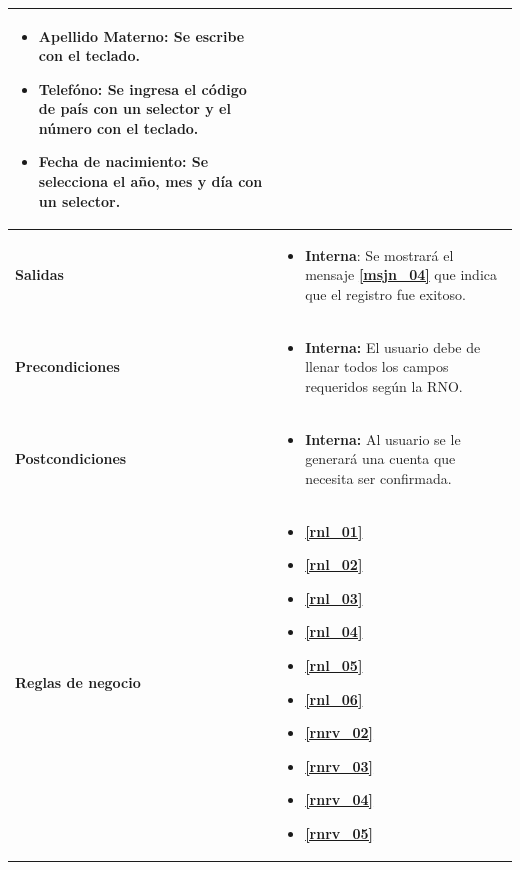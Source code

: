 \begin{center}
\begin{longtable}{| p{3.5cm} | p{11.5cm} |}
\begin{itemize}
              \item \textbf{Apellido Materno}: Se escribe con el teclado.
              \item \textbf{Telefóno}: Se ingresa el código de país con un selector y el número con el teclado.
              \item \textbf{Fecha de nacimiento}: Se selecciona el año, mes y día con un selector.
            \end{itemize} \\
        \hline	
          \textbf{Salidas} &  
          \begin{itemize}
              \item \textbf{Interna}: Se mostrará el mensaje \textbf{\ref{msjn_04}} que indica que el registro fue exitoso.
            \end{itemize} \\
        \hline	
          \textbf{Precondiciones}& 
            \begin{itemize}
              \item \textbf{Interna:} El usuario debe de llenar todos los campos requeridos según la RNO.
            \end{itemize} \\
        \hline	
          \textbf{Postcondiciones} & 
            \begin{itemize}
              \item \textbf{Interna:} Al usuario se le generará una cuenta que necesita ser confirmada.
            \end{itemize} \\
        \hline    
           \textbf{Reglas de negocio} & 
             \begin{itemize}
               \item \textbf{\ref{rnl_01}}
               \item \textbf{\ref{rnl_02}}
               \item \textbf{\ref{rnl_03}}
               \item \textbf{\ref{rnl_04}}
               \item \textbf{\ref{rnl_05}}
               \item \textbf{\ref{rnl_06}}
               \item \textbf{\ref{rnrv_02}}
               \item \textbf{\ref{rnrv_03}}
               \item \textbf{\ref{rnrv_04}}
               \item \textbf{\ref{rnrv_05}}

\end{itemize}
\end{longtable}
\end{center}
